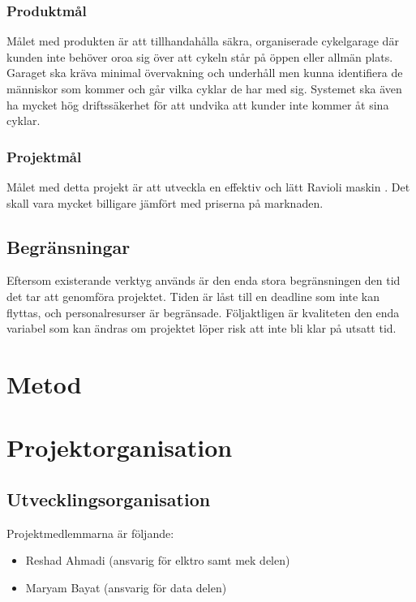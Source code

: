 \documentclass[a4paper]{article}
\begin{document}
\subsubsection{Produktmål}
Målet med produkten är att tillhandahålla säkra, organiserade cykelgarage där kunden inte behöver oroa 
sig över att cykeln står på öppen eller allmän plats. Garaget ska kräva minimal övervakning och underhåll men 
kunna identifiera de människor som kommer och går vilka cyklar de har med sig. Systemet ska även ha mycket 
hög driftssäkerhet för att undvika att kunder inte kommer åt sina cyklar.

\subsubsection{Projektmål}
Målet med detta projekt är att utveckla en effektiv och  lätt Ravioli maskin . 
Det skall vara mycket  billigare jämfört med priserna på marknaden. 

\subsection{Begränsningar} %
Eftersom existerande verktyg används är den enda stora begränsningen den tid det tar att genomföra 
projektet. Tiden är låst till en deadline som inte kan flyttas, och personalresurser är begränsade. 
Följaktligen är kvaliteten den enda variabel som kan ändras om projektet löper risk att inte bli klar 
på utsatt tid.


\section{Metod}

\section{Projektorganisation} %
\subsection{Utvecklingsorganisation} %
Projektmedlemmarna är följande:

\begin{itemize}
\item Reshad Ahmadi (ansvarig för elktro samt mek delen)
\item Maryam Bayat (ansvarig för data delen)

\end{itemize}
\end{document}
